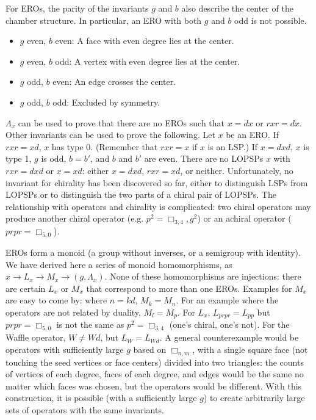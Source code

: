 \documentclass{amsart}[12pt]
\begin{document}
For EROs, the parity of the invariants $g$ and $b$ also describe the center of the chamber structure.
In particular, an ERO with both $g$ and $b$ odd is not possible.
\begin{itemize}
  \item $g$ even, $b$ even: A face with even degree lies at the center.
  \item $g$ even, $b$ odd: A vertex with even degree lies at the center.
  \item $g$ odd, $b$ even: An edge crosses the center.
  \item $g$ odd, $b$ odd: Excluded by symmetry.
\end{itemize}

$\Lambda_x$ can be used to prove that there are no EROs such that
$x = dx$ or $rxr = dx$. Other invariants can be used to prove the following.
Let $x$ be an ERO. If $rxr=xd$, $x$ has type 0. (Remember that $rxr = x$ if
$x$ is an LSP.) If $x=dxd$, $x$ is type 1, $g$ is odd, $b=b'$, and $b$ and
$b'$ are even. There are no LOPSPs $x$ with
$rxr = dxd$ or $x=xd$: either $x = dxd$, $rxr = xd$, or neither.
Unfortunately, no invariant for chirality has been discovered so far, either
to distinguish LSPs from LOPSPs or to distinguish the two parts of a chiral
pair of LOPSPs. The relationship with operators and chirality is complicated:
two chiral operators may produce another chiral operator (e.g.
$p^2 = \Box_{3,4}, g^2$) or an achiral operator ($prpr = \Box_{5,0}$).

EROs form a monoid (a group without inverses, or a semigroup with identity).
We have derived here a series of monoid homomorphisms, as
$x \to L_x \to M_x \to (g, \Lambda_x)$. None of these homomorphisms are
injections: there are certain $L_x$ or $M_x$ that correspond to more than one
EROs. Examples for $M_x$ are easy to come by: where $n = kd$, $M_k = M_n$. For
an example where the operators are not related by duality, $M_l = M_p$. For
$L_x$, $L_{prpr} = L_{pp}$ but $prpr = \Box_{5,0}$ is not the same as $p^2 =
\Box_{3,4}$ (one's chiral, one's not). For the Waffle operator, $W \ne Wd$,
but $L_W = L_{Wd}$. A general counterexample would be operators with
sufficiently large $g$ based on $\Box_{n,m}$, with a single square face (not
touching the seed vertices or face centers) divided into two triangles: the
counts of vertices of each degree, faces of each degree, and edges would be
the same no matter which faces was chosen, but the operators would be
different. With this construction, it is possible (with a sufficiently large
$g$) to create arbitrarily large sets of operators with the same invariants.
\end{document}
